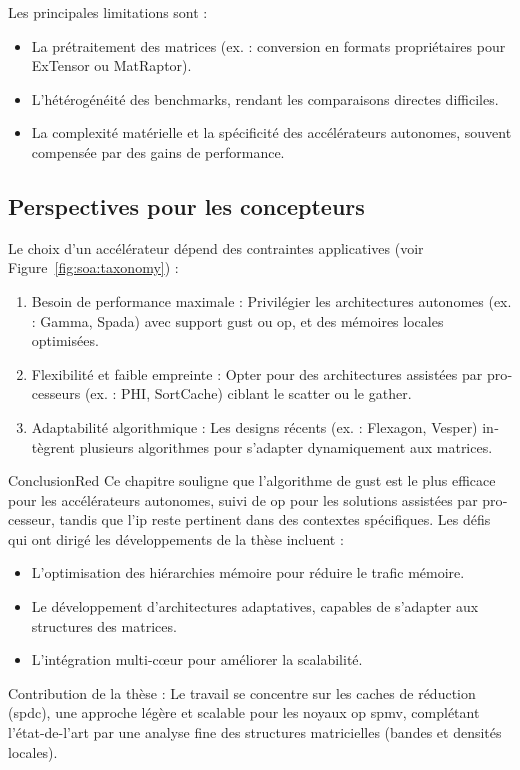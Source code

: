 \begin{otherlanguage}{french}
Les principales limitations sont :
\begin{itemize}
    \item La prétraitement des matrices (ex. : conversion en formats propriétaires pour ExTensor ou MatRaptor).
    \item L'hétérogénéité des benchmarks, rendant les comparaisons directes difficiles.
    \item La complexité matérielle et la spécificité des accélérateurs autonomes, souvent compensée par des gains de performance.
\end{itemize}

\subsection*{Perspectives pour les concepteurs}

Le choix d'un accélérateur dépend des contraintes applicatives (voir Figure~\ref{fig:soa:taxonomy}) :
\begin{enumerate}
    \item Besoin de performance maximale : Privilégier les architectures autonomes (ex. : Gamma, Spada) avec support \acrshort{gust} ou \acrshort{op}, et des mémoires locales optimisées.
    \item Flexibilité et faible empreinte : Opter pour des architectures assistées par processeurs (ex. : PHI, SortCache) ciblant le \gls{scatter} ou le \gls{gather}.
    \item Adaptabilité algorithmique : Les designs récents (ex. : Flexagon, Vesper) intègrent plusieurs algorithmes pour s'adapter dynamiquement aux matrices.
\end{enumerate}

\bigskip
\begin{highlight}{Conclusion}{Red}
    Ce chapitre souligne que l'algorithme de \acrlong{gust} est le plus efficace pour les accélérateurs autonomes, suivi de \acrshort{op} pour les solutions assistées par processeur, tandis que l'\acrshort{ip} reste pertinent dans des contextes spécifiques.
    Les défis qui ont dirigé les développements de la thèse incluent :
    \begin{itemize}
        \item L'optimisation des hiérarchies mémoire pour réduire le trafic mémoire.
        \item Le développement d'architectures adaptatives, capables de s'adapter aux structures des matrices.
        \item L'intégration multi-c\oe{}ur pour améliorer la scalabilité.
    \end{itemize}
    Contribution de la thèse : Le travail se concentre sur les caches de réduction (\acrlong{spdc}), une approche légère et scalable pour les noyaux \acrshort{op} \acrshort{spmv}, complétant l'état-de-l'art par une analyse fine des structures matricielles (bandes et densités locales).
\end{highlight}


\end{otherlanguage}
